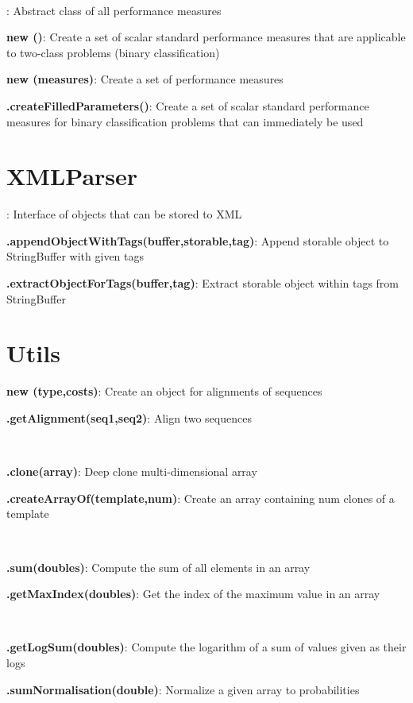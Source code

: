\documentclass[10pt]{scrartcl}
\newcommand{\entry}[3]{{\bfseries #1#2}: #3}
\begin{document}
\begin{flushleft}
~

\entry{\AbstractPerformanceMeasure}{}{Abstract class of all performance measures}

\entry{new \NumericalPerformanceMeasureParameterSet}{()}{Create a set of scalar standard performance measures that are applicable to two-class problems (binary classification)}

\entry{new \PerformanceMeasureParameterSet}{(measures)}{Create a set of performance measures}

\entry{\PerformanceMeasureParameterSet}{.createFilledParameters()}{Create a set of scalar standard performance measures for binary classification problems that can immediately be used}

\section{XMLParser}

\entry{\Storable}{}{Interface of objects that can be stored to XML}

\entry{\XMLParser}{.appendObjectWithTags(buffer,storable,tag)}{Append storable object to StringBuffer with given tags}

\entry{\XMLParser}{.extractObjectForTags(buffer,tag)}{Extract storable object within tags from StringBuffer}

\section{Utils}

\entry{new \Alignment}{(type,costs)}{Create an object for alignments of sequences}

\entry{\Alignment}{.getAlignment(seq1,seq2)}{Align two sequences}

~

\entry{\ArrayHandler}{.clone(array)}{Deep clone multi-dimensional array}

\entry{\ArrayHandler}{.createArrayOf(template,num)}{Create an array containing num clones of a template}

~

\entry{\ToolBox}{.sum(doubles)}{Compute the sum of all elements in an array}

\entry{\ToolBox}{.getMaxIndex(doubles)}{Get the index of the maximum value in an array}

~

\entry{\Normalisation}{.getLogSum(doubles)}{Compute the logarithm of a sum of values given as their logs}

\entry{\Normalisation}{.sumNormalisation(double)}{Normalize a given array to probabilities}
\end{flushleft}
\end{document}
